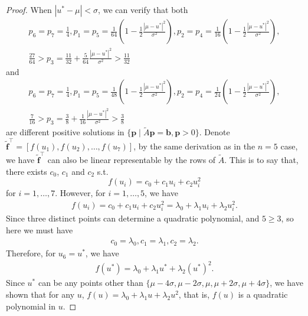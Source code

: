 \documentclass[11pt]{article}
\theoremstyle{referenceplain}
\theoremstyle{referencedefinition}
\theoremstyle{referenceremark}
\begin{document}
\begin{proof}
When $|u^* - \mu|< \sigma$, we can verify that both 
\begin{align*}
    p_6=p_7 = \frac{1}{4}, p_1 = p_5 = \frac{1}{64}\left(1-\frac{1}{2}\frac{|\mu-u^*|^2}{\sigma^2}\right), p_2 = p_4 = \frac{1}{16}\left(1-\frac{1}{2}\frac{|\mu-u^*|^2}{\sigma^2}\right),\\ \frac{27}{64}>p_3 = \frac{11}{32} + \frac{5}{64}\frac{|\mu-u^*|^2}{\sigma^2}>\frac{11}{32}
\end{align*}
and 
\begin{align*}
    p_6=p_7 = \frac{1}{4}, p_1 = p_5 = \frac{1}{48}\left(1-\frac{1}{2}\frac{|\mu-u^*|^2}{\sigma^2}\right), p_2 = p_4 = \frac{1}{24}\left(1-\frac{1}{2}\frac{|\mu-u^*|^2}{\sigma^2}\right),\\ \frac{7}{16}>p_3 = \frac{3}{8} + \frac{1}{16}\frac{|\mu-u^*|^2}{\sigma^2}> \frac{3}{8}
\end{align*}
are different positive solutions in $\{\mathbf{p} \mid \widetilde{A}\mathbf{p}=\mathbf{b}, \mathbf{p} > 0\}$. Denote $\widetilde{\mathbf{f}}^\top=[f(u_1), f(u_2), \dots, f(u_7)]$, by the same derivation as in the $n=5$ case, we have $\widetilde{\mathbf{f}}^\top$ can also be linear representable by the rows of $\widetilde{A}$. This is to say that, there exists $c_0$, $c_1$ and $c_2$ s.t. 
$$ f(u_i) = c_0 + c_1 u_i + c_2 u_i^2 $$
for $i=1,\dots,7$. However, for $i=1,\dots,5$, we have
\begin{align*}
    f(u_i) = c_0 + c_1 u_i + c_2 u_i^2 = \lambda_0 +\lambda_1 u_i + \lambda_2 u_i^2.
\end{align*}
Since three distinct points can determine a quadratic polynomial, and $5\ge 3$, so here we must have
\begin{align*}
    c_0 = \lambda_0, c_1 = \lambda_1, c_2 = \lambda_2.
\end{align*}
Therefore, for $u_6=u^*$, we have 
\begin{align*}
    f(u^*) = \lambda_0+\lambda_1 u^* + \lambda_2(u^*)^2.
\end{align*}
Since $u^*$ can be any points other than $\{\mu-4\sigma,\mu-2\sigma,\mu,\mu+2\sigma,\mu+4\sigma\}$, we have shown that for any $u$, $f(u) =\lambda_0+\lambda_1 u + \lambda_2 u^2$, that is, $f(u)$ is a quadratic polynomial in $u$.
\end{proof}
\end{document}
